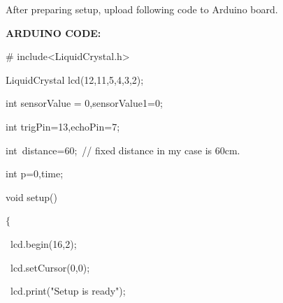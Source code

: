 \documentclass[12pt]{article}
\begin{document}
\vspace{\baselineskip}
{\fontsize{14pt}{16.8pt}\selectfont After preparing setup, upload following code to Arduino board.\par}\par

\vspace{\baselineskip}
{\fontsize{14pt}{16.8pt}\selectfont \textbf{ARDUINO CODE:}\par}\par

\vspace{\baselineskip}
{\fontsize{14pt}{16.8pt}\selectfont $\#$ include<LiquidCrystal.h>\par}\par

{\fontsize{14pt}{16.8pt}\selectfont LiquidCrystal lcd(12,11,5,4,3,2);\par}\par

{\fontsize{14pt}{16.8pt}\selectfont int sensorValue = 0,sensorValue1=0;\par}\par

{\fontsize{14pt}{16.8pt}\selectfont int trigPin=13,echoPin=7;\par}\par

{\fontsize{14pt}{16.8pt}\selectfont int\ distance=60;\   // fixed distance in my case is 60cm. \par}\par

{\fontsize{14pt}{16.8pt}\selectfont int p=0,time;\par}\par

{\fontsize{14pt}{16.8pt}\selectfont void setup() \par}\par

{\fontsize{14pt}{16.8pt}\selectfont $ \{ $ \par}\par

{\fontsize{14pt}{16.8pt}\selectfont \  lcd.begin(16,2);\par}\par

{\fontsize{14pt}{16.8pt}\selectfont \  lcd.setCursor(0,0);\par}\par

{\fontsize{14pt}{16.8pt}\selectfont \  lcd.print("Setup is ready");\par}\par
\end{document}
